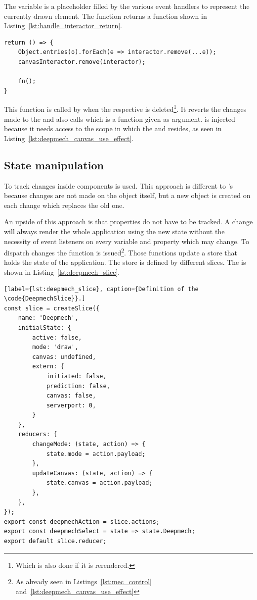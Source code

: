 The  variable is a placeholder filled by the various event handlers to represent the currently drawn  element.
The  function returns a function shown in Listing~\ref{lst:handle_interactor_return}.

\begin{lstlisting}[label={lst:handle_interactor_return}, caption={Return value of \code{handleInteractor}.}]
return () => {
    Object.entries(o).forEach(e => interactor.remove(...e));
    canvasInteractor.remove(interactor);

    fn();
}
\end{lstlisting}

This function is called by  when the respective  is deleted\footnote{Which is also done if it is rerendered.}.
It reverts the changes made to the  and also calls  which is a function given as argument.
 is injected because it needs access to the scope in which the  and  resides, as seen in Listing~\ref{lst:deepmech_canvas_use_effect}.

\subsection{State manipulation}\label{ch:state_manipulation}

To track changes inside components \cite{Abramov2021} is used.
This approach is different to 's because changes are not made on the object itself, but a new object is created on each change which replaces the old one.

An upside of this approach is that properties do not have to be tracked.
A change will always render the whole application using the new state without the necessity of event listeners on every variable and property which may change.
To dispatch changes the  function is issued\footnote{As already seen in Listings~\ref{lst:mec_control} and~\ref{lst:deepmech_canvas_use_effect}}.
Those functions update a store that holds the state of the application.
The store is defined by different slices.
The  is shown in Listing~\ref{lst:deepmech_slice}.

\begin{lstlisting}[label={lst:deepmech_slice}, caption={Definition of the \code{DeepmechSlice}}.]
const slice = createSlice({
    name: 'Deepmech',
    initialState: {
        active: false,
        mode: 'draw',
        canvas: undefined,
        extern: {
            initiated: false,
            prediction: false,
            canvas: false,
            serverport: 0,
        }
    },
    reducers: {
        changeMode: (state, action) => {
            state.mode = action.payload;
        },
        updateCanvas: (state, action) => {
            state.canvas = action.payload;
        },
    },
});
export const deepmechAction = slice.actions;
export const deepmechSelect = state => state.Deepmech;
export default slice.reducer;
\end{lstlisting}

